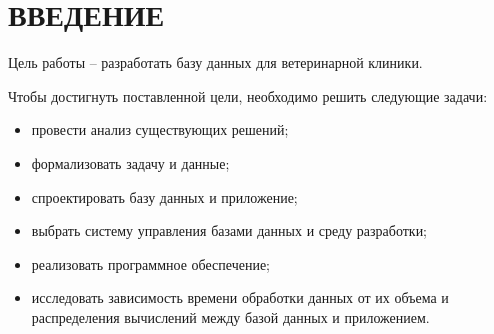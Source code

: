 \section*{ВВЕДЕНИЕ}

Цель работы -- разработать базу данных для ветеринарной клиники.

Чтобы достигнуть поставленной цели, необходимо решить следующие задачи:
\begin{itemize}[label*=---]
	\item провести анализ существующих решений;
    \item формализовать задачу и данные;
    \item спроектировать базу данных и приложение;
    \item выбрать систему управления базами данных и среду разработки;
    \item реализовать программное обеспечение;
    \item исследовать зависимость времени обработки данных от их объема и распределения вычислений между базой данных и приложением.
\end{itemize}
